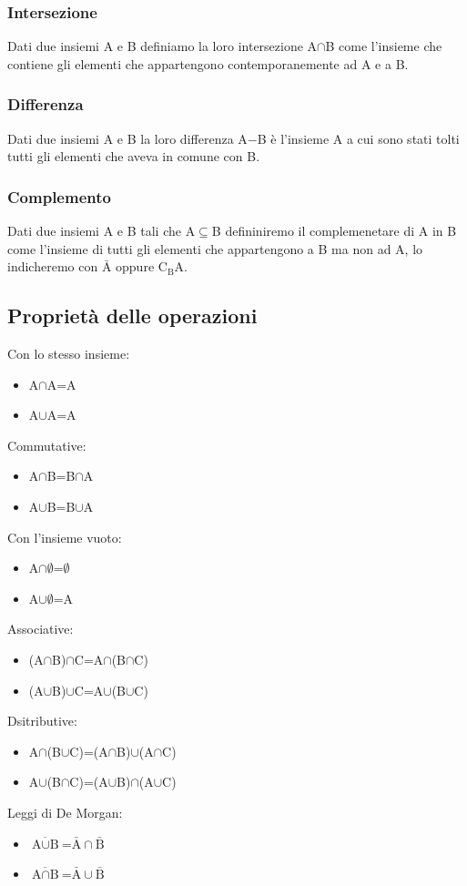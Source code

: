 \documentclass{book}
\begin{document}
    \subsubsection{Intersezione}
    Dati due insiemi A e B definiamo la loro intersezione A$\cap$B come l'insieme che contiene gli elementi che appartengono contemporanemente ad A e a B.

    \subsubsection{Differenza}
    Dati due insiemi A e B la loro differenza A$-$B è l'insieme A a cui sono stati tolti tutti gli elementi che aveva in comune con B.

    \subsubsection{Complemento}
    Dati due insiemi A e B tali che A$\subseteq$B defininiremo il complemenetare di A in B come l'insieme di tutti gli elementi che appartengono a B ma non ad A, lo indicheremo con $\bar{\text{A}}$ oppure $\text{C}_{\text{B}}\text{A}$.

    \subsection{Proprietà delle operazioni}
    Con lo stesso insieme:
    \begin{itemize}
        \item A$\cap$A=A
        \item A$\cup$A=A
    \end{itemize}
    Commutative:
    \begin{itemize}
        \item A$\cap$B=B$\cap$A
        \item A$\cup$B=B$\cup$A
    \end{itemize}
    Con l'insieme vuoto:
    \begin{itemize}
        \item A$\cap \emptyset$=$\emptyset$
        \item A$\cup \emptyset$=A
    \end{itemize}
    Associative:
    \begin{itemize}
        \item (A$\cap$B)$\cap$C=A$\cap$(B$\cap$C)
        \item (A$\cup$B)$\cup$C=A$\cup$(B$\cup$C)
    \end{itemize}
    Dsitributive:
    \begin{itemize}
        \item A$\cap$(B$\cup$C)=(A$\cap$B)$\cup$(A$\cap$C)
        \item A$\cup$(B$\cap$C)=(A$\cup$B)$\cap$(A$\cup$C)
    \end{itemize}
    Leggi di De Morgan:
    \begin{itemize}
        \item $\overline{\text{A} \cup \text{B}}$=$\bar{\text{A}} \cap \bar{\text{B}}$
        \item $\overline{\text{A} \cap \text{B}}$=$\bar{\text{A}} \cup \bar{\text{B}}$
    \end{itemize}
\end{document}
